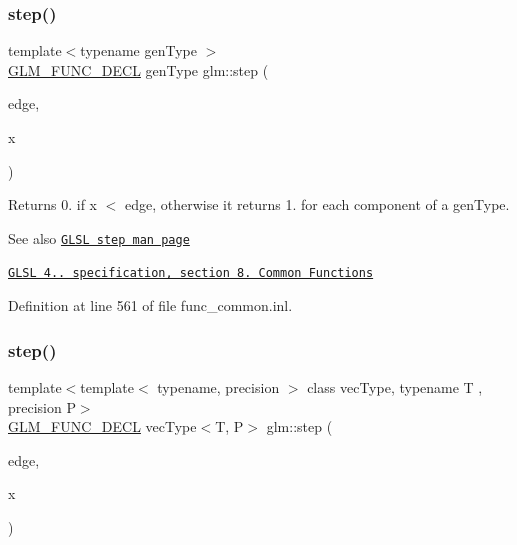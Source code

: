 \subsubsection{\texorpdfstring{step()}{step()}\hspace{0.1cm}{\footnotesize\ttfamily [1/2]}}
{\footnotesize\ttfamily template$<$typename gen\+Type $>$ \\
\hyperlink{setup_8hpp_ab2d052de21a70539923e9bcbf6e83a51}{G\+L\+M\+\_\+\+F\+U\+N\+C\+\_\+\+D\+E\+CL} gen\+Type glm\+::step (\begin{DoxyParamCaption}\item[{gen\+Type const \&}]{edge,  }\item[{gen\+Type const \&}]{x }\end{DoxyParamCaption})}

Returns 0. if x $<$ edge, otherwise it returns 1. for each component of a gen\+Type.

\begin{DoxySeeAlso}{See also}
\href{http://www.opengl.org/sdk/docs/manglsl/xhtml/step.xml}{\tt G\+L\+SL step man page} 

\href{http://www.opengl.org/registry/doc/GLSLangSpec.4.20.8.pdf}{\tt G\+L\+SL 4.. specification, section 8. Common Functions} 
\end{DoxySeeAlso}


Definition at line 561 of file func\+\_\+common.\+inl.

\mbox{\label{group__core__func__common_gae830a682901c0ba63c92a7d201bba007}} 
\subsubsection{\texorpdfstring{step()}{step()}\hspace{0.1cm}{\footnotesize\ttfamily [2/2]}}
{\footnotesize\ttfamily template$<$template$<$ typename, precision $>$ class vec\+Type, typename T , precision P$>$ \\
\hyperlink{setup_8hpp_ab2d052de21a70539923e9bcbf6e83a51}{G\+L\+M\+\_\+\+F\+U\+N\+C\+\_\+\+D\+E\+CL} vec\+Type$<$T, P$>$ glm\+::step (\begin{DoxyParamCaption}\item[{T const \&}]{edge,  }\item[{vec\+Type$<$ T, P $>$ const \&}]{x }\end{DoxyParamCaption})}

